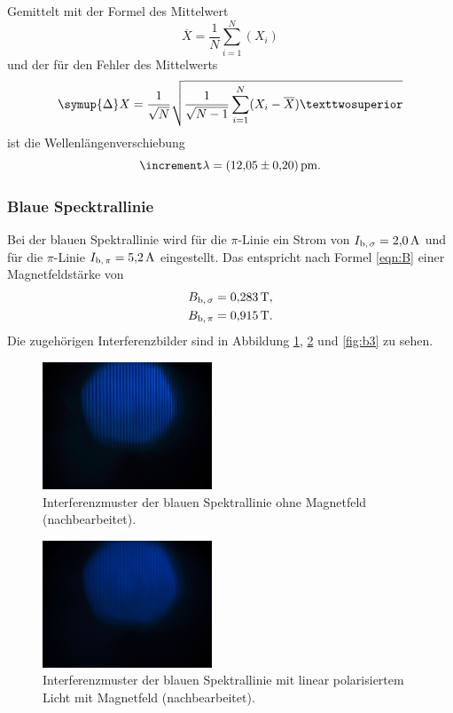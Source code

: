 Gemittelt mit der Formel des Mittelwert 
\begin{equation}
  \label{eqn:X}
  \overline{X} = \frac{1}{N} \sum_{i=1}^N (X_i)
\end{equation}
und der für den Fehler des Mittelwerts 
\begin{equation}
    \label{eqn:dX}
    \symup{\Delta} X = \frac{1}{\sqrt{N}} \sqrt{\frac{1}{\sqrt{N-1}} \sum_{i=1}^N (X_{i}-\overline{X})²}
\end{equation}
ist die Wellenlängenverschiebung 
\begin{equation*}
  \increment \lambda = \SI{12.05\pm0.20}{\pico\meter}.
\end{equation*}

\subsubsection{Blaue Specktrallinie}
Bei der blauen Spektrallinie wird für die $\pi$-Linie ein Strom von $I_{\text{b,\,}\sigma} = \SI{2.0}{\ampere}$ und für die $\pi$-Linie $I_{\text{b,\,}\pi} = \SI{5.2}{\ampere}$ eingestellt. 
Das entspricht nach Formel \ref{eqn:B} einer Magnetfeldstärke  von 
\begin{align*}
 B_{\text{b,\,}\sigma} &= \SI{0.283}{\tesla},\\
 B_{\text{b,\,}\pi} &=\SI{0.915}{\tesla}.
\end{align*} 
Die zugehörigen Interferenzbilder sind in Abbildung \ref{fig:b1}, \ref{fig:b2} und \ref{fig:b3} zu sehen. 
\FloatBarrier
\begin{figure}
  \centering
  \includegraphics[width=0.45\textwidth]{IMG_0121k.jpg}
  \caption{Interferenzmuster der blauen Spektrallinie ohne Magnetfeld (nachbearbeitet).}
  \label{fig:b1}
\end{figure}
\FloatBarrier
\begin{figure}
  \centering
  \includegraphics[width=0.45\textwidth]{IMG_0122k.jpg}
  \caption{Interferenzmuster der blauen Spektrallinie mit linear polarisiertem Licht mit Magnetfeld (nachbearbeitet).}
  \label{fig:b2}
\end{figure}
